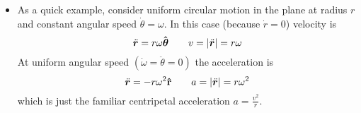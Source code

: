 \documentclass[11pt, a4paper]{article}
\newcommand{\bddot}[1]{\ddot{\bm{#1}}} %
\newcommand{\uvec}[1]{\bm{\hat{\mathbf{#1}}}} %
\begin{document}
\begin{itemize}
	\item As a quick example, consider uniform circular motion in the plane at radius $ r $ and constant angular speed $ \dot{\theta} = \omega $. In this case (because $ \dot{r} = 0 $) velocity is
	\begin{equation*}
		\bddot{r} = r \omega \uvec{\theta} \qquad v = \abs{\bddot{r}} = r \omega
	\end{equation*}
	At uniform angular speed $ (\dot{\omega} = \ddot{\theta} = 0) $ the acceleration is 
	\begin{equation*}
		\bddot{r} = -r \omega^{2} \uvec{r} \qquad a = \abs{\bddot{r}} = r \omega^{2}
	\end{equation*}
	which is just the familiar centripetal acceleration $ a = \frac{v^{2}}{r} $.

\end{itemize}
\end{document}
